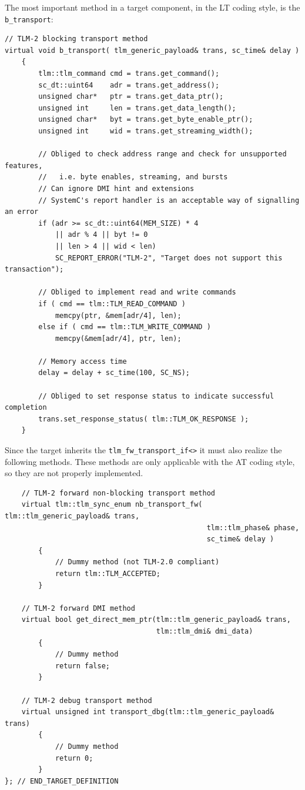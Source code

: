 \documentclass[11pt]{article}
\begin{document}
The most important method in a target component, in the LT coding style, is the \texttt{b\_transport}:
\begin{verbatim}
// TLM-2 blocking transport method
virtual void b_transport( tlm_generic_payload& trans, sc_time& delay )
    {
        tlm::tlm_command cmd = trans.get_command();
        sc_dt::uint64    adr = trans.get_address();
        unsigned char*   ptr = trans.get_data_ptr();
        unsigned int     len = trans.get_data_length();
        unsigned char*   byt = trans.get_byte_enable_ptr();
        unsigned int     wid = trans.get_streaming_width();

        // Obliged to check address range and check for unsupported features,
        //   i.e. byte enables, streaming, and bursts
        // Can ignore DMI hint and extensions
        // SystemC's report handler is an acceptable way of signalling an error
        if (adr >= sc_dt::uint64(MEM_SIZE) * 4 
            || adr % 4 || byt != 0 
            || len > 4 || wid < len)
            SC_REPORT_ERROR("TLM-2", "Target does not support this transaction");

        // Obliged to implement read and write commands
        if ( cmd == tlm::TLM_READ_COMMAND )
            memcpy(ptr, &mem[adr/4], len);
        else if ( cmd == tlm::TLM_WRITE_COMMAND )
            memcpy(&mem[adr/4], ptr, len);

        // Memory access time
        delay = delay + sc_time(100, SC_NS);

        // Obliged to set response status to indicate successful completion
        trans.set_response_status( tlm::TLM_OK_RESPONSE );
    }
\end{verbatim}
Since the target inherits the \texttt{tlm\_fw\_transport\_if<>} it must also realize the following methods.
These methods are only applicable with the AT coding style, so they are not properly implemented.
\begin{verbatim}
    // TLM-2 forward non-blocking transport method
    virtual tlm::tlm_sync_enum nb_transport_fw( tlm::tlm_generic_payload& trans,
                                                tlm::tlm_phase& phase, 
                                                sc_time& delay )
        {
            // Dummy method (not TLM-2.0 compliant)
            return tlm::TLM_ACCEPTED;
        }

    // TLM-2 forward DMI method
    virtual bool get_direct_mem_ptr(tlm::tlm_generic_payload& trans,
                                    tlm::tlm_dmi& dmi_data)
        {
            // Dummy method
            return false;
        }

    // TLM-2 debug transport method
    virtual unsigned int transport_dbg(tlm::tlm_generic_payload& trans)
        {
            // Dummy method
            return 0;
        }
}; // END_TARGET_DEFINITION
\end{verbatim}
\end{document}
